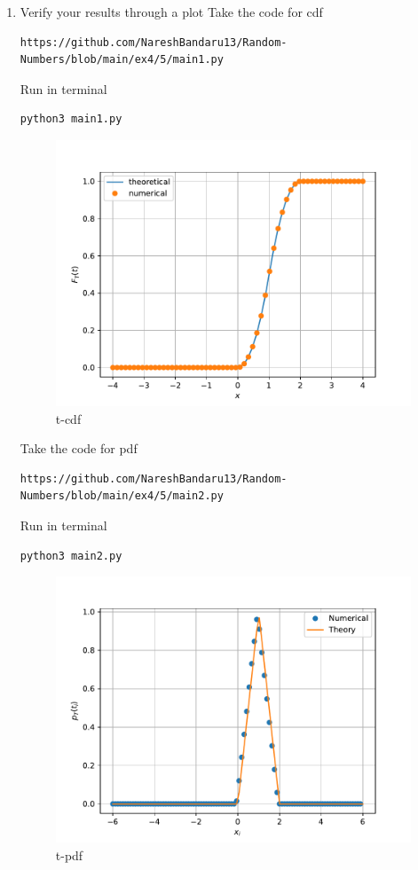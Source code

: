 \documentclass[journal,12pt,twocolumn]{IEEEtran}
\renewcommand\thesection{\arabic{section}}
\begin{document}
\begin{enumerate}[label=\thesection.\arabic*
,ref=\thesection.\theenumi]
\item Verify your results through a plot
Take the code for cdf
\begin{lstlisting}
https://github.com/NareshBandaru13/Random-Numbers/blob/main/ex4/5/main1.py
\end{lstlisting}
Run in terminal
\begin{lstlisting}
python3 main1.py
\end{lstlisting}
\begin{figure}[H]
    \centering
    \includegraphics[scale = 0.6]{t_cdf.pdf}
    \caption{t-cdf}
    \label{fig:t-cdf}
\end{figure}

Take the code for pdf
\begin{lstlisting}
https://github.com/NareshBandaru13/Random-Numbers/blob/main/ex4/5/main2.py
\end{lstlisting}
Run in terminal
\begin{lstlisting}
python3 main2.py
\end{lstlisting}
\begin{figure}[H]
    \centering
    \includegraphics[scale = 0.6]{t.pdf}
    \caption{t-pdf}
    \label{fig:t-pdf}
\end{figure}

\end{enumerate}
\end{document}
